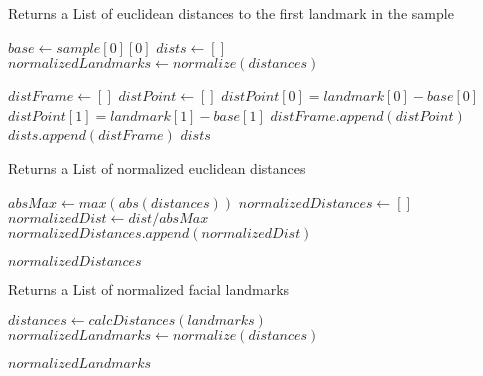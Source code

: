 \begin{algorithm}[tbp]
\caption{}
\label{alg:normalize} 
\begin{algorithmic}[1]     %

	\Statex Returns a List of euclidean distances to the first landmark in the sample
	


	\State $base \gets sample[0][0]$
	\State $dists \gets []$
	\State $normalizedLandmarks \gets normalize(distances)$
	
		\State $distFrame \gets []$
			\State $distPoint \gets []$
			\State $distPoint[0] = landmark[0] - base[0]$
			\State $distPoint[1] = landmark[1] - base[1]$
			\State $distFrame.append(distPoint)$
		\EndFor
		\State $dists.append(distFrame)$
	\EndFor
		\State \Return $dists$
\EndProcedure


	\Statex Returns a List of normalized euclidean distances
	


	\State $absMax \gets max(abs(distances))$
	\State $normalizedDistances \gets []$
			\State $normalizedDist \gets dist / absMax$
			\State $normalizedDistances.append(normalizedDist)$
		\EndFor
	\EndFor
	
		\State \Return $normalizedDistances$
\EndProcedure


	\Statex Returns a List of normalized facial landmarks
	


	\State $distances \gets calcDistances(landmarks)$
	\State $normalizedLandmarks \gets normalize(distances)$
	
		\State \Return $normalizedLandmarks$
\EndProcedure
\end{algorithmic}
\end{algorithm}
